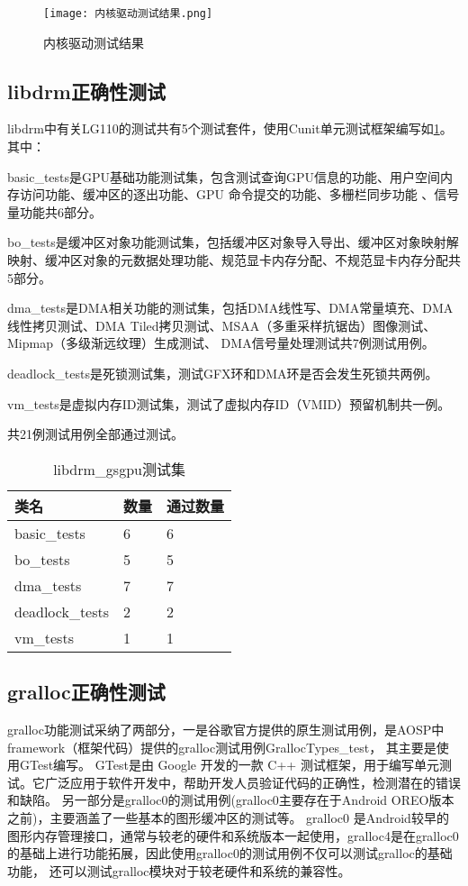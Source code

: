 \begin{figure}[h]
    \centering
    \texttt{[image: 内核驱动测试结果.png]}
    \caption{内核驱动测试结果}
    \label{fig:内核驱动测试结果}
\end{figure}

\subsection{libdrm正确性测试}
libdrm中有关LG110的测试共有5个测试套件，使用Cunit单元测试框架编写如\ref{tab:libdrm_gsgpu测试集}。其中：

basic\_tests是GPU基础功能测试集，包含测试查询GPU信息的功能、用户空间内存访问功能、缓冲区的逐出功能、GPU 命令提交的功能、多栅栏同步功能 、信号量功能共6部分。

bo\_tests是缓冲区对象功能测试集，包括缓冲区对象导入导出、缓冲区对象映射解映射、缓冲区对象的元数据处理功能、规范显卡内存分配、不规范显卡内存分配共5部分。

dma\_tests是DMA相关功能的测试集，包括DMA线性写、DMA常量填充、DMA线性拷贝测试、DMA Tiled拷贝测试、MSAA（多重采样抗锯齿）图像测试、Mipmap（多级渐远纹理）生成测试、
DMA信号量处理测试共7例测试用例。

deadlock\_tests是死锁测试集，测试GFX环和DMA环是否会发生死锁共两例。

vm\_tests是虚拟内存ID测试集，测试了虚拟内存ID（VMID）预留机制共一例。

共21例测试用例全部通过测试。

\begin{table}[h]
    \centering
    \caption{libdrm\_gsgpu测试集}
    \label{tab:libdrm_gsgpu测试集}
    \begin{tabular}{lll}
      \toprule
      类名   &  数量  &通过数量\\
      \midrule
      basic\_tests & 6 & 6\\
      bo\_tests & 5 & 5\\
      dma\_tests & 7 & 7\\
      deadlock\_tests & 2 &2\\
      vm\_tests & 1 &1\\
      \bottomrule
    \end{tabular}
    \note{}
\end{table}

\subsection{gralloc正确性测试}
gralloc功能测试采纳了两部分，一是谷歌官方提供的原生测试用例，是AOSP中framework（框架代码）提供的gralloc测试用例GrallocTypes\_test，
其主要是使用GTest编写。
GTest\cite{GoogleTest}是由 Google 开发的一款 C++ 测试框架，用于编写单元测试。它广泛应用于软件开发中，帮助开发人员验证代码的正确性，检测潜在的错误和缺陷。
另一部分是gralloc0的测试用例(gralloc0主要存在于Android OREO版本之前)，主要涵盖了一些基本的图形缓冲区的测试等。
gralloc0 是Android较早的图形内存管理接口，通常与较老的硬件和系统版本一起使用，gralloc4是在gralloc0的基础上进行功能拓展，因此使用gralloc0的测试用例不仅可以测试gralloc的基础功能，
还可以测试gralloc模块对于较老硬件和系统的兼容性。


